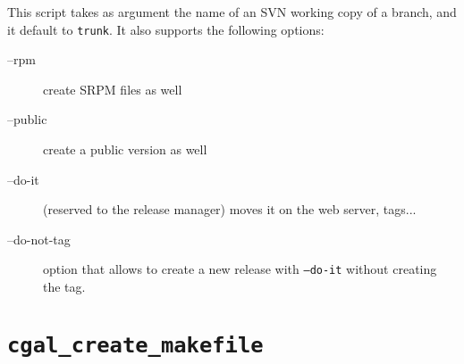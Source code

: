 This script takes as argument the name of an SVN working copy of a branch,
and it default to {\tt trunk}.  It also supports the following options:
\begin{description}
\item[--rpm]      create SRPM files as well
\item[--public]   create a public version as well
\item[--do-it]    (reserved to the release manager) moves it on the web server,
                  tags...
\item[--do-not-tag] option that allows to create a new release with
  \texttt{--do-it} without creating the tag.
\end{description}



\section{{\tt cgal\_create\_makefile}}
\label{sec:cgal_create_makefile}

